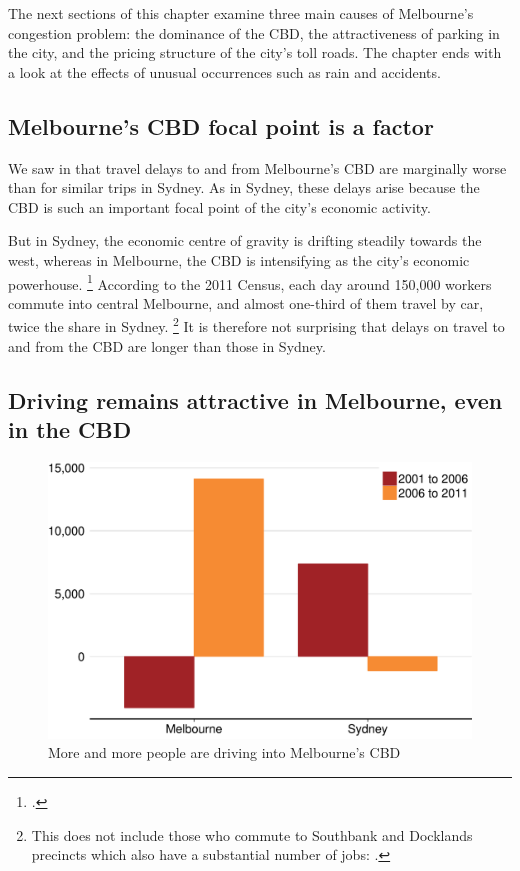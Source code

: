 \documentclass{grattan}
\begin{document}
The next sections of this chapter examine three main causes of Melbourne's congestion problem: the dominance of the CBD, the attractiveness of parking in the city, and the pricing structure of the city's toll roads.
The chapter ends with a look at the effects of unusual occurrences such as rain and accidents.

\subsection{Melbourne's CBD focal point is a factor}

We saw in  that travel delays to and from Melbourne’s CBD are marginally worse than for similar trips in Sydney.
As in Sydney, these delays arise because the CBD is such an important focal point of the city's economic activity.

But in Sydney, the economic centre of gravity is drifting steadily towards the west, whereas in Melbourne, the CBD is intensifying as the city's economic powerhouse.%
\footcite{2016-Rasmussen-changing-business-location}
According to the 2011 Census, each day around 150,000 workers commute into central Melbourne, and 
almost one-third of them travel by car, twice the share in Sydney.%
	\footnote{This does not include those who commute to Southbank and Docklands precincts which also have a substantial number of jobs: \textcite{ABS2011Census}.}
It is therefore not surprising that delays on travel to and from the CBD are longer than those in Sydney.


\subsection{Driving remains attractive in Melbourne, even in the CBD}

\begin{figure}[t]
\caption{More and more people are driving into Melbourne's CBD\label{fig:drivers-to-Melb}}
\includegraphics{atlas/absolute-change-in-vehicle-numbers-by-City-year-1.pdf}
\end{figure}
\end{document}
